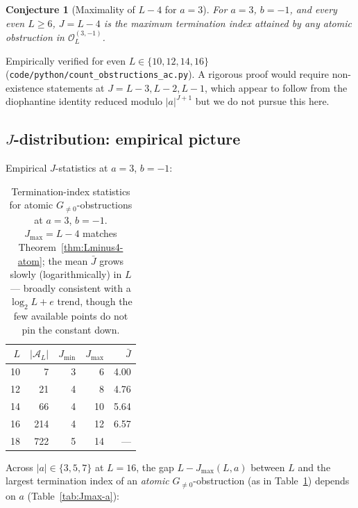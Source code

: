\documentclass[11pt,reqno]{amsart}
\theoremstyle{plain}
\newtheorem{conjecture}[theorem]{Conjecture}
\theoremstyle{definition}
\theoremstyle{remark}
\newcommand{\Obs}{\mathcal{O}}
\newcommand{\Atom}{\mathcal{A}}
\newcommand{\srcpath}[1]{\nolinkurl{#1}}
\begin{document}
\begin{conjecture}[Maximality of $L - 4$ for $a = 3$]\label{conj:Jmax}
For $a = 3$, $b = -1$, and every \emph{even} $L \ge 6$, $J = L - 4$ is
the maximum termination index attained by any atomic obstruction in
$\Obs_L^{(3,-1)}$.
\end{conjecture}

Empirically verified for even $L \in \{10, 12, 14, 16\}$
(\srcpath{code/python/count_obstructions_ac.py}). A rigorous proof
would require non-existence statements at $J = L - 3, L - 2, L - 1$,
which appear to follow from the diophantine identity reduced modulo
$\lvert a \rvert^{J+1}$ but we do not pursue this here.

\subsection{\texorpdfstring{$J$}{J}-distribution: empirical picture}

Empirical $J$-statistics at $a = 3$, $b = -1$:

\begin{table}[ht]
\centering
\begin{tabular}{rrrrr}
\toprule
$L$ & $\lvert \Atom_L \rvert$ & $J_{\min}$ & $J_{\max}$ & $\bar J$ \\
\midrule
10 & 7 & 3 & 6 & 4.00 \\
12 & 21 & 4 & 8 & 4.76 \\
14 & 66 & 4 & 10 & 5.64 \\
16 & 214 & 4 & 12 & 6.57 \\
18 & 722 & 5 & 14 & --- \\
\bottomrule
\end{tabular}
\caption{Termination-index statistics for atomic
$G_{\ne 0}$-ob\-struc\-tions at $a = 3$, $b = -1$. $J_{\max} = L - 4$ matches
Theorem~\ref{thm:Lminus4-atom}; the mean $\bar J$ grows
slowly (logarithmically) in $L$ --- broadly consistent with a $\log_2 L +
e$ trend, though the few available points do not pin the constant down.}
\label{tab:J-stats}
\end{table}

Across $\lvert a \rvert \in \{3, 5, 7\}$ at $L = 16$, the gap
$L - J_{\max}(L, a)$ between $L$ and the largest termination index of an
\emph{atomic} $G_{\ne 0}$-obstruction (as in Table~\ref{tab:J-stats})
depends on $a$ (Table~\ref{tab:Jmax-a}):
\end{document}
